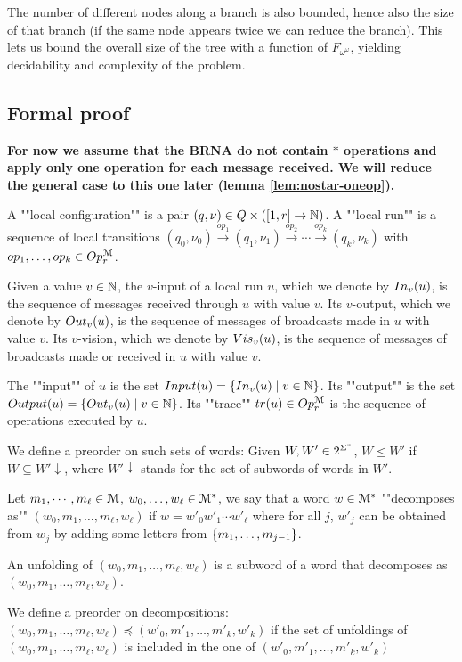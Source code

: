  The number of different nodes along a branch is also bounded, hence also the size of that branch (if the same node appears twice we can reduce the branch).
 This lets us bound the overall size of the tree with a function of $F_{\omega^\omega}$, yielding decidability and complexity of the problem.

\subsection{Formal proof}

\textbf{For now we assume that the BRNA do not contain $*$ operations and apply only one operation for each message received. We will reduce the general case to this one later (lemma \ref{lem:nostar-oneop}).}

\begin{definition}
	A ""local configuration"" is a pair $(q, \nu) \in Q \times ([1,r] \to \mathbb{N})$.
	A ""local run"" is a sequence of local transitions $(q_0, \nu_0) \xrightarrow{op_1} (q_1, \nu_1) \xrightarrow{op_2} \cdots \xrightarrow{op_k} (q_k, \nu_k)$ with $op_1, \ldots, op_k \in Op_r^{\mathcal{M}}$.
	
	Given a value $v \in \mathbb{N}$, the $v$-input of a local run $u$, which we denote by $In_{v}(u)$, is the sequence of messages received through $u$ with value $v$.
	Its $v$-output, which we denote by $Out_{v}(u)$, is the sequence of messages of broadcasts made in $u$ with value $v$. 
	Its $v$-vision, which we denote by $Vis_{v}(u)$, is the sequence of messages of broadcasts made or received in $u$ with value $v$.
	
	The ""input"" of $u$ is the set $Input(u) = \{In_{v}(u) \mid v \in \mathbb{N}\}$.
	Its ""output"" is the set $Output(u)=\{Out_{v}(u) \mid v \in \mathbb{N}\}$.
	Its ""trace"" $tr(u) \in Op^{\mathcal{M}}_r$ is the sequence of operations executed by $u$.
	
	We define a preorder on such sets of words:
	Given $W, W' \in 2^{\Sigma^*}$, $W \unlhd W'$ if $W \subseteq W'\downarrow$, where $W'\downarrow$ stands for the set of subwords of words in $W'$.
\end{definition}



\begin{definition}
	Let $m_1, \cdots, m_\ell \in \mathcal{M}$, $w_0, \ldots, w_\ell \in \mathcal{M}^*$, we say that a word $w \in \mathcal{M}^*$ ""decomposes as"" $(w_0, m_1, \ldots, m_\ell, w_\ell)$ if $w = w'_0 w'_1 \cdots w'_\ell$ where for all $j$, $w'_j$ can be obtained from $w_j$ by adding some letters from $\{m_1, \ldots, m_{j-1}\}$.
	
	An unfolding of $(w_0, m_1, \ldots, m_\ell, w_\ell)$ is a subword of a word that decomposes as $(w_0, m_1, \ldots, m_\ell, w_\ell)$. 
	
	We define a preorder on decompositions:
	$(w_0, m_1, \ldots, m_\ell, w_\ell) \preceq (w'_0, m'_1, \ldots, m'_k, w'_k)$ if the set of unfoldings of $(w_0, m_1, \ldots, m_\ell, w_\ell)$ is included in the one of $(w'_0, m'_1, \ldots, m'_k, w'_k)$
\end{definition}


